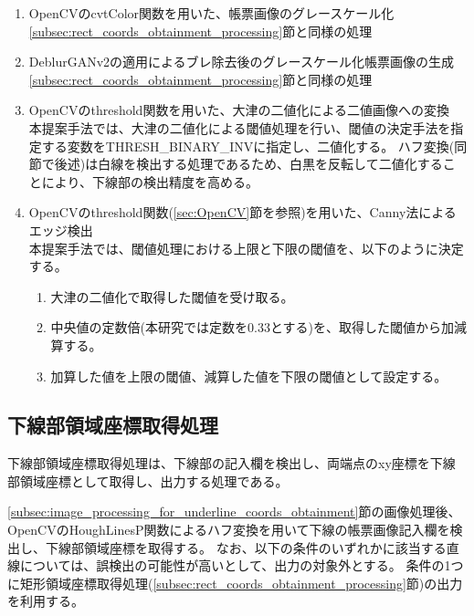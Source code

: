 \begin{enumerate}
    \item OpenCVのcvtColor関数を用いた、帳票画像のグレースケール化\\
        \ref{subsec:rect_coords_obtainment_processing}節と同様の処理
    \item DeblurGANv2の適用によるブレ除去後のグレースケール化帳票画像の生成\\
        \ref{subsec:rect_coords_obtainment_processing}節と同様の処理
    \item OpenCVのthreshold関数を用いた、大津の二値化による二値画像への変換\\
        本提案手法では、大津の二値化による閾値処理を行い、閾値の決定手法を指定する変数をTHRESH\_BINARY\_INVに指定し、二値化する。
        ハフ変換(同節で後述)は白線を検出する処理であるため、白黒を反転して二値化することにより、下線部の検出精度を高める。
    \item OpenCVのthreshold関数(\ref{sec:OpenCV}節を参照)を用いた、Canny法によるエッジ検出\\
        本提案手法では、閾値処理における上限と下限の閾値を、以下のように決定する。
        \begin{enumerate}
            \item 大津の二値化で取得した閾値を受け取る。
            \item 中央値の定数倍(本研究では定数を0.33とする)を、取得した閾値から加減算する。
            \item 加算した値を上限の閾値、減算した値を下限の閾値として設定する。
        \end{enumerate}
\end{enumerate}


\subsection{下線部領域座標取得処理}\label{subsec:underline_coords_obtainment_processing}
下線部領域座標取得処理は、下線部の記入欄を検出し、両端点のxy座標を下線部領域座標として取得し、出力する処理である。

\ref{subsec:image_processing_for_underline_coords_obtainment}節の画像処理後、OpenCVのHoughLinesP関数によるハフ変換を用いて下線の帳票画像記入欄を検出し、下線部領域座標を取得する。
なお、以下の条件のいずれかに該当する直線については、誤検出の可能性が高いとして、出力の対象外とする。
条件の1つに矩形領域座標取得処理(\ref{subsec:rect_coords_obtainment_processing}節)の出力を利用する。


